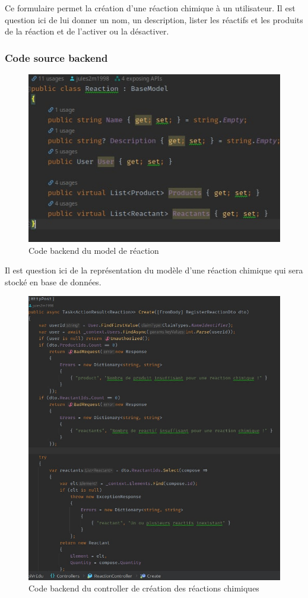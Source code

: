 Ce formulaire permet la création d'une réaction chimique à un utilisateur. Il est question ici de lui donner un nom, un description,
lister les réactifs et les produits de la réaction et de l'activer ou la désactiver.

\subsubsection{Code source backend}

\begin{figure}[H]
	\centering
	\includegraphics[width=1\textwidth]{img/mre}
	\caption{Code backend du model de réaction}
\end{figure}

Il est question ici de la représentation du modèle d'une réaction chimique qui sera stocké en base de données.

\begin{figure}[H]
	\centering
	\includegraphics[width=1\textwidth]{img/crec}
	\caption{Code backend du controller de création des réactions chimiques}
\end{figure}

